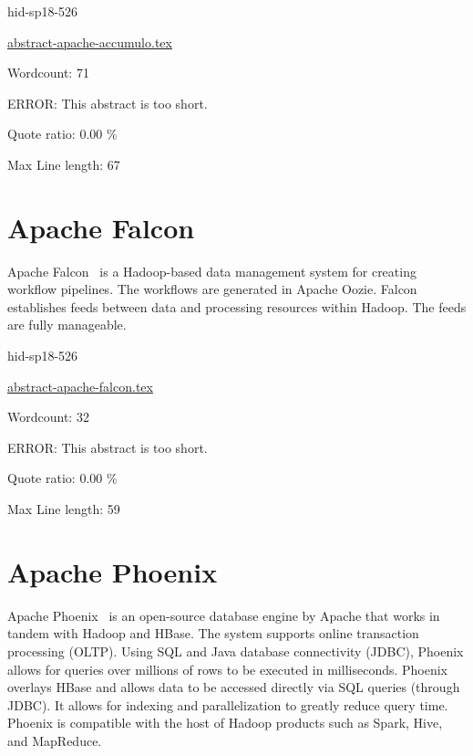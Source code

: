 \begin{IU}

hid-sp18-526

\href{https://github.com/cloudmesh-community/hid-sp18-526/blob/master//technology/abstract-apache-accumulo.tex}{abstract-apache-accumulo.tex}

 

Wordcount: 71

ERROR: This abstract is too short.


Quote ratio: 0.00 \%
 
Max Line length: 67
\end{IU}

\section{Apache Falcon}

Apache Falcon~\cite{hid-sp18-www-526-apache-falcon} is
a Hadoop-based data management system for creating
workflow pipelines. The workflows are generated in Apache
Oozie. Falcon establishes feeds between data and processing
resources within Hadoop. The feeds are fully manageable.


\begin{IU}

hid-sp18-526

\href{https://github.com/cloudmesh-community/hid-sp18-526/blob/master//technology/abstract-apache-falcon.tex}{abstract-apache-falcon.tex}

 

Wordcount: 32

ERROR: This abstract is too short.


Quote ratio: 0.00 \%
 
Max Line length: 59
\end{IU}

\section{Apache Phoenix}

Apache Phoenix~\cite{hid-sp18-www-526-apache-phoenix} 
is an open-source database engine by Apache that works 
in tandem with Hadoop and HBase. The system supports online 
transaction processing (OLTP). Using SQL and Java database 
connectivity (JDBC), Phoenix allows for queries over millions of rows 
to be executed in milliseconds. Phoenix overlays HBase and allows 
data to be accessed directly via SQL queries (through JDBC). It allows
for indexing and parallelization to greatly reduce query time. Phoenix
is compatible with the host of Hadoop products such as Spark, Hive, 
and MapReduce.


